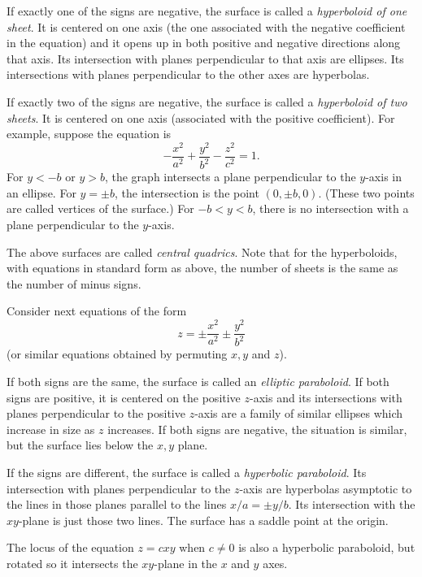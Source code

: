 If exactly one of the signs are negative, the surface is called a
\emph{hyperboloid of one sheet}.   It is centered on one axis
(the one associated with the negative coefficient in the equation)
and it opens up in both positive and negative directions along
that axis.  Its intersection with planes perpendicular to that
axis are ellipses.   Its intersections with planes perpendicular to
the other axes are hyperbolas.


If exactly two of the signs are negative, the surface is called
a \emph{hyperboloid of two sheets}.   It is centered on one
axis (associated with the positive coefficient).  For example,
suppose the equation is
\[
  -\frac{x^2}{a^2}
  +\frac{y^2}{b^2}
  -\frac{z^2}{c^2} = 1.
\]
For $y < -b$ or $y > b$, the graph intersects a plane perpendicular
to the $y$-axis in an ellipse.  For $y = \pm b$, the intersection
is the point $(0,\pm b, 0)$.  (These two points are called vertices
of the surface.)  For $-b < y < b$, there is no intersection with
a plane perpendicular to the $y$-axis.


The above surfaces are called \emph{central quadrics}.
Note that for the hyperboloids, with equations in standard form as
above, the number of sheets is the same as
the number of minus signs.

Consider next equations of the form
\[
   z = \pm \frac{x^2}{a^2} \pm \frac{y^2}{b^2}
\]
(or similar equations obtained by permuting $x, y$ and $z$).

If both signs are the same, the surface is called an {\it elliptic
paraboloid}.   If both signs are positive, it is centered on the
positive $z$-axis and its intersections with planes perpendicular to
the positive $z$-axis are a family of similar ellipses which increase
in size as $z$ increases.   If both signs are negative, the situation
is similar, but the surface lies below the $x,y$ plane.


If the signs are different, the surface is called a {\it
hyperbolic paraboloid}.  Its intersection with planes perpendicular
to the $z$-axis are hyperbolas asymptotic to the lines in
those planes parallel to the lines $x/a = \pm y/b$.   Its intersection
with the $xy$-plane is just those two lines.  The surface has
a saddle point at the origin.


The locus of the equation $z = cxy$ when  $c\neq 0$ is also a hyperbolic
paraboloid, but rotated so it intersects the $xy$-plane in the
$x$ and $y$ axes. 

